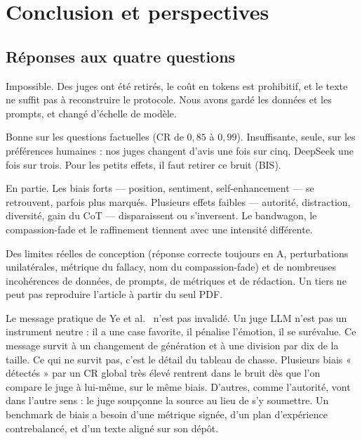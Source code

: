 \chapter{Conclusion et perspectives}
\label{chap-conclusion}

\section{Réponses aux quatre questions}

\begin{description}[style=nextline,leftmargin=1.6em]
  \item[Q1 --- Mêmes modèles.]
    Impossible. Des juges ont été retirés, le coût en tokens est prohibitif, et le texte ne suffit pas à reconstruire le protocole. Nous avons gardé les données et les prompts, et changé d'échelle de modèle.
  \item[Q2 --- Stabilité.]
    Bonne sur les questions factuelles (CR de $0{,}85$ à $0{,}99$). Insuffisante, seule, sur les préférences humaines : nos juges changent d'avis une fois sur cinq, DeepSeek une fois sur trois. Pour les petits effets, il faut retirer ce bruit (BIS).
  \item[Q3 --- Modèles récents.]
    En partie. Les biais forts --- position, sentiment, self-enhancement --- se retrouvent, parfois plus marqués. Plusieurs effets faibles --- autorité, distraction, diversité, gain du CoT --- disparaissent ou s'inversent. Le bandwagon, le compassion-fade et le raffinement tiennent avec une intensité différente.
  \item[Q4 --- Benchmark.]
    Des limites réelles de conception (réponse correcte toujours en A, perturbations unilatérales, métrique du fallacy, nom du compassion-fade) et de nombreuses incohérences de données, de prompts, de métriques et de rédaction. Un tiers ne peut pas reproduire l'article à partir du seul PDF.
\end{description}

Le message pratique de Ye et al.\ \cite{ye2025justice} n'est pas invalidé. Un juge LLM n'est pas un instrument neutre : il a une case favorite, il pénalise l'émotion, il se surévalue. Ce message survit à un changement de génération et à une division par dix de la taille. Ce qui ne survit pas, c'est le détail du tableau de chasse. Plusieurs biais « détectés » par un CR global très élevé rentrent dans le bruit dès que l'on compare le juge à lui-même, sur le même biais. D'autres, comme l'autorité, vont dans l'autre sens : le juge soupçonne la source au lieu de s'y soumettre. Un benchmark de biais a besoin d'une métrique signée, d'un plan d'expérience contrebalancé, et d'un texte aligné sur son dépôt.

